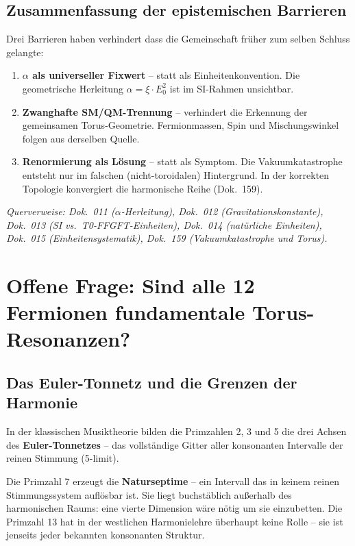 \subsection{Zusammenfassung der epistemischen Barrieren}

Drei Barrieren haben verhindert dass die Gemeinschaft früher
zum selben Schluss gelangte:

\begin{enumerate}
    \item \textbf{$\alpha$ als universeller Fixwert} -- statt als
          Einheitenkonvention. Die geometrische Herleitung
          $\alpha = \xi \cdot E_0^2$ ist im SI-Rahmen unsichtbar.

    \item \textbf{Zwanghafte SM/QM-Trennung} -- verhindert die
          Erkennung der gemeinsamen Torus-Geometrie. Fermionmassen,
          Spin und Mischungswinkel folgen aus derselben Quelle.

    \item \textbf{Renormierung als Lösung} -- statt als Symptom.
          Die Vakuumkatastrophe entsteht nur im falschen
          (nicht-toroidalen) Hintergrund. In der korrekten
          Topologie konvergiert die harmonische Reihe (Dok.~159).
\end{enumerate}

\textit{Querverweise: Dok.~011 ($\alpha$-Herleitung), Dok.~012
(Gravitationskonstante), Dok.~013 (SI vs.\ T0-FFGFT-Einheiten),
Dok.~014 (natürliche Einheiten), Dok.~015 (Einheitensystematik),
Dok.~159 (Vakuumkatastrophe und Torus).}


\section{Offene Frage: Sind alle 12 Fermionen fundamentale Torus-Resonanzen?}

\subsection{Das Euler-Tonnetz und die Grenzen der Harmonie}

In der klassischen Musiktheorie bilden die Primzahlen 2, 3 und 5
die drei Achsen des \textbf{Euler-Tonnetzes} -- das vollständige
Gitter aller konsonanten Intervalle der reinen Stimmung (5-limit).

Die Primzahl 7 erzeugt die \textbf{Naturseptime} -- ein Intervall
das in keinem reinen Stimmungssystem auflösbar ist. Sie liegt
buchstäblich außerhalb des harmonischen Raums: eine vierte Dimension
wäre nötig um sie einzubetten. Die Primzahl 13 hat in der
westlichen Harmonielehre überhaupt keine Rolle -- sie ist jenseits
jeder bekannten konsonanten Struktur.

